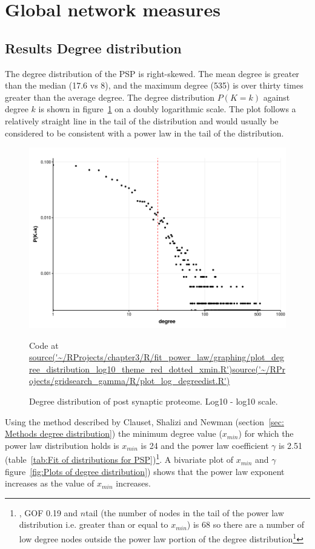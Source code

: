 \clearpage
\section{Global network measures}




\subsection{Results Degree distribution}
\label{sec:results degree distribution}
The degree distribution of the PSP is right-skewed. The mean degree is greater than the median (17.6 vs 8), and the maximum degree (535) is over thirty times greater than the average degree. 
 The degree distribution $P(K=k)$ against degree $k$ is shown in figure~\ref{fig:Degree distribution of post synaptic proteome. Log10 - log10 scale1} on a doubly logarithmic scale. The plot follows a relatively straight line in the tail of the distribution and would usually be considered to be consistent with a power law in the tail of the distribution.

\begin{figure}
    \includegraphics[width=12cm]{images/chapter3/poweRlaw/Rplot_degree_distribution_log10pktheme.png}
    \caption{Degree distribution of post synaptic proteome. Log10 - log10 scale.}
    \tiny Code at \url{source('~/RProjects/chapter3/R/fit_power_law/graphing/plot_degree_distribution_log10_theme_red_dotted_xmin.R')}\url{source('~/RProjects/gridsearch_gamma/R/plot_log_degreedist.R') }
    \label{fig:Degree distribution of post synaptic proteome. Log10 - log10 scale1}
\end{figure}


Using the method described by Clauset, Shalizi and Newman (section~\ref{sec: Methods degree distribution}) the minimum degree value ($x_{min}$) for which the power law distribution holds is $x_{min}$ is 24 and the power law coefficient $\gamma$ is 2.51 (table~\ref{tab:Fit of distributions for PSP})\footnote{, GOF 0.19 and  $n$tail (the number of nodes in the tail of the power law distribution i.e. greater than or equal to $x_{min}$) is 68 so there are a number of low degree  nodes outside the power law portion of the degree distribution\footnote{\url{source('~/RProjects/group_size_distribution/R/calulate_cdf.R')}}}. A bivariate plot of $x_{min}$ and $\gamma$ figure~\ref{fig:Plots of degree distribution}) shows that the power law exponent increases as the value of $x_{min}$ increases.

